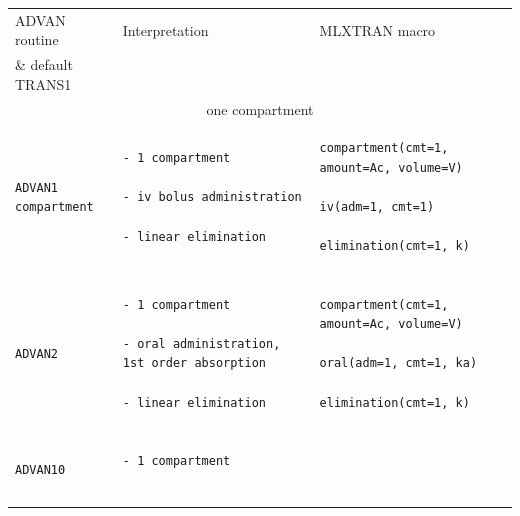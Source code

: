 \begin{center}
\begin{longtable}{lll}
  \hline
  \hline
ADVAN routine & Interpretation & MLXTRAN macro \\
\& default TRANS1 &		& \\
\hline
\multicolumn{3}{c}{one compartment}  \\[.1ex]
\hline
\lstset{language=NONMEMdataSet}
\begin{lstlisting}
ADVAN1
compartment
\end{lstlisting}
&
\lstset{language=Elements}
\begin{lstlisting}
- 1 compartment

- iv bolus administration

- linear elimination
\end{lstlisting}
& 
\lstset{language=MLXTRANcode}
\begin{lstlisting}
compartment(cmt=1, amount=Ac, volume=V)

iv(adm=1, cmt=1)

elimination(cmt=1, k)
\end{lstlisting} 

\\
& 
\\
\hdashline


\lstset{language=NONMEMdataSet}
\begin{lstlisting}
ADVAN2
\end{lstlisting}
&
\lstset{language=Elements}
\begin{lstlisting}
- 1 compartment

- oral administration, 1st order absorption

- linear elimination
\end{lstlisting}
%
&
\lstset{language=MLXTRANcode}
\begin{lstlisting}
compartment(cmt=1, amount=Ac, volume=V)

oral(adm=1, cmt=1, ka)

elimination(cmt=1, k)
\end{lstlisting}

\\
& 
\\
\hdashline

\lstset{language=NONMEMdataSet}
\begin{lstlisting}
ADVAN10
\end{lstlisting}
&
\lstset{language=Elements}
\begin{lstlisting}
- 1 compartment


\end{lstlisting}
\end{longtable}
\end{center}
